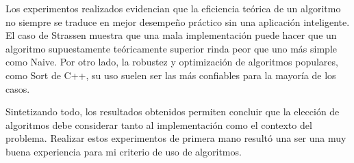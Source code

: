 

Los experimentos realizados evidencian que la eficiencia teórica de un algoritmo no siempre se traduce en mejor desempeño práctico sin una aplicación inteligente. El caso de Strassen muestra que una mala implementación puede hacer que un algoritmo supuestamente teóricamente superior rinda peor que uno más simple como Naive. Por otro lado, la robustez y optimización de algoritmos populares, como Sort de C++, su uso suelen ser las más confiables para la mayoría de los casos.

Sintetizando todo, los resultados obtenidos permiten concluir que la elección de algoritmos debe considerar tanto al implementación como el contexto del problema. Realizar estos experimentos de primera mano resultó una ser una muy buena experiencia para mi criterio de uso de algoritmos.